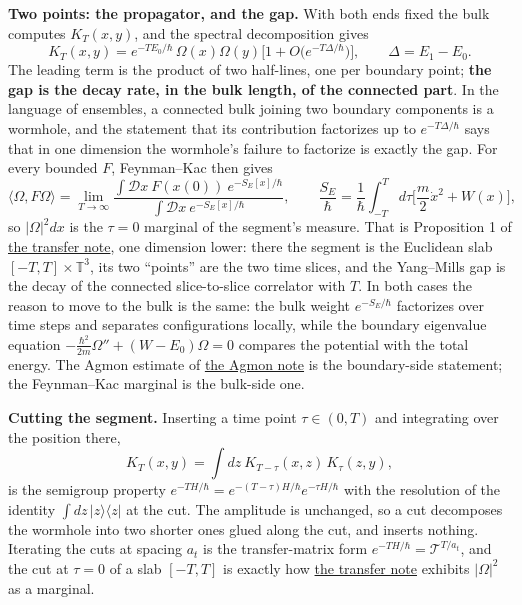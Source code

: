 \documentclass[11pt,a4paper]{article}
\begin{document}
\textbf{Two points: the propagator, and the gap.} With both ends fixed
the bulk computes \(K_T(x,y)\), and the spectral decomposition gives
\[K_T(x,y)=e^{-TE_0/\hbar}\,\Omega(x)\Omega(y)\Big[1+O\big(e^{-T\Delta/\hbar}\big)\Big],
\qquad \Delta=E_1-E_0 .\] The leading term is the product of two
half-lines, one per boundary point; \textbf{the gap is the decay rate,
in the bulk length, of the connected part}. In the language of
ensembles, a connected bulk joining two boundary components is a
wormhole, and the statement that its contribution factorizes up to
\(e^{-T\Delta/\hbar}\) says that in one dimension the wormhole's failure
to factorize is exactly the gap. For every bounded \(F\), Feynman--Kac
then gives \[\langle\Omega,F\Omega\rangle=\lim_{T\to\infty}
\frac{\int\mathcal Dx\ F(x(0))\ e^{-S_E[x]/\hbar}}{\int\mathcal Dx\ e^{-S_E[x]/\hbar}},
\qquad
\frac{S_E}{\hbar}=\frac1\hbar\int_{-T}^{T}d\tau\Big[\frac m2\dot x^2+W(x)\Big],\]
so \(|\Omega|^2dx\) is the \(\tau=0\) marginal of the segment's measure.
That is Proposition 1 of \href{ground-state-measure-transfer.md}{the
transfer note}, one dimension lower: there the segment is the Euclidean
slab \([-T,T]\times\mathbb T^3\), its two ``points'' are the two time
slices, and the Yang--Mills gap is the decay of the connected
slice-to-slice correlator with \(T\). In both cases the reason to move
to the bulk is the same: the bulk weight \(e^{-S_E/\hbar}\) factorizes
over time steps and separates configurations locally, while the boundary
eigenvalue equation \(-\frac{\hbar^2}{2m}\Omega''+(W-E_0)\Omega=0\)
compares the potential with the total energy. The Agmon estimate of
\href{ground-state-measure-transfer.md\#weighted-estimates-and-global-magnetic-tails}{the
Agmon note} is the boundary-side statement; the Feynman--Kac marginal is
the bulk-side one.

\textbf{Cutting the segment.} Inserting a time point \(\tau\in(0,T)\)
and integrating over the position there,
\[K_T(x,y)=\int dz\ K_{T-\tau}(x,z)\,K_\tau(z,y),\] is the semigroup
property \(e^{-TH/\hbar}=e^{-(T-\tau)H/\hbar}e^{-\tau H/\hbar}\) with
the resolution of the identity \(\int dz\,|z\rangle\langle z|\) at the
cut. The amplitude is unchanged, so a cut decomposes the wormhole into
two shorter ones glued along the cut, and inserts nothing. Iterating the
cuts at spacing \(a_t\) is the transfer-matrix form
\(e^{-TH/\hbar}=\mathcal T^{T/a_t}\), and the cut at \(\tau=0\) of a
slab \([-T,T]\) is exactly how
\href{ground-state-measure-transfer.md}{the transfer note} exhibits
\(|\Omega|^2\) as a marginal.
\end{document}
